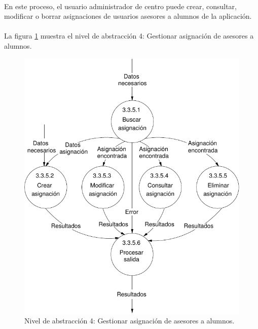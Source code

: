\paragraph{}En este proceso, el usuario administrador de centro puede crear,
consultar, modificar o borrar asignaciones de usuarios asesores a alumnos de la
aplicación.

\paragraph{}La figura \ref{diagramaNivel4-GestionarAsignacion}
muestra el nivel de abstracción 4: Gestionar asignación de asesores a alumnos.

  \begin{figure}[!ht]
    \begin{center}
      \includegraphics[]{08.Analisis_Funcional/8.2.DFDs/Niveles/Nivel4/AdministradorCentro/GestionarAsignacion/Diagramas/nivel4-GestionarAsignacion.pdf}
      \caption{Nivel de abstracción 4: Gestionar asignación de asesores a alumnos.}
      \label{diagramaNivel4-GestionarAsignacion}
    \end{center}
  \end{figure}
